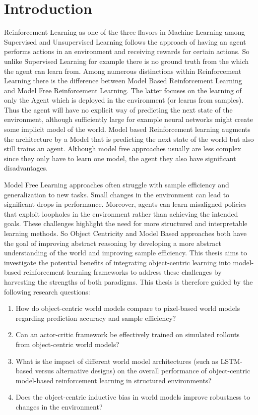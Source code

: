 \documentclass[
	english,
	ruledheaders=section,
	class=report,
	thesis={type=master},
	accentcolor=9c,
	custommargins=true,
	marginpar=false,
	parskip=half-,
	fontsize=11pt,
]{tudapub}
\begin{document}
\chapter{Introduction}
\label{chap:introduction}

Reinforcement Learning as one of the three flavors in Machine Learning among
Supervised and Unsupervised Learning follows the approach of having an agent
performs actions in an environment and receiving rewards for certain actions.
So unlike Supervised Learning for example there is no ground truth from the
which the agent can learn from. Among numerous distinctions within
Reinforcement Learning there is the difference between Model Based
Reinforcement Learning and Model Free Reinforcement Learning. The latter
focuses on the learning of only the Agent which is deployed in the environment
(or learns from samples). Thus the agent will have no explicit way of
predicting the next state of the environment, although sufficiently large for
example neural networks might create some implicit model of the world. Model
based Reinforcement learning augments the architecture by a Model that is
predicting the next state of the world but also still trains an agent. Although
model free approaches usually are less complex since they only have to learn
one model, the agent they also have significant disadvantages.

Model Free Learning approaches often struggle with sample efficiency and
generalization to new tasks. Small changes in the environment can lead to
significant drops in performance. Moreover, agents can learn misaligned
policies that exploit loopholes in the environment rather than achieving the
intended goals. These challenges highlight the need for more structured and
interpretable learning methods. So Object Centricity and Model Based approaches
both have the goal of improving abstract reasoning by developing a more
abstract understanding of the world and improving sample efficiency. This
thesis aims to investigate the potential benefits of integrating object-centric
learning into model-based reinforcement learning frameworks to address these
challenges by harvesting the strengths of both paradigms. This thesis is
therefore guided by the following research questions:
\begin{enumerate}
	\item How do object-centric world models compare to pixel-based world models
	      regarding prediction accuracy and sample efficiency?
	\item Can an actor-critic framework be effectively trained on simulated rollouts from
	      object-centric world models?
	\item What is the impact of different world model architectures (such as LSTM-based
	      versus alternative designs) on the overall performance of object-centric
	      model-based reinforcement learning in structured environments?
	\item Does the object-centric inductive bias in world models improve robustness to
	      changes in the environment?
\end{enumerate}
\end{document}
